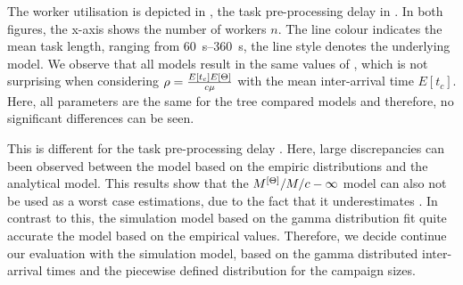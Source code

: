 The worker utilisation \workerUtilization is depicted in , the task pre-processing delay \preTaskProcessingDelay in .
In both figures, the x-axis shows the number of workers \(n\).
The line colour indicates the mean task length, ranging from \SIrange{60}{360}{\second}, the line style denotes the underlying model.
We observe that all models result in the same values of \workerUtilization, which is not surprising when considering \(\rho = \frac{E[t_c] E[\Theta]}{c\mu}\) with the mean inter-arrival time \(E[t_c]\).
Here, all parameters are the same for the tree compared models and therefore, no significant differences can be seen.

This is different for the task pre-processing delay \preTaskProcessingDelay. 
Here, large discrepancies can been observed between the model based on the empiric distributions and the analytical model.
This results show that the \(M^{[\Theta]}/M/c-\infty\) model can also not be used as a worst case estimations, due to the fact that it underestimates \preTaskProcessingDelay.
In contrast to this, the simulation model based on the gamma distribution fit quite accurate the model based on the empirical values.
Therefore, we decide continue our evaluation with the simulation model, based on the gamma distributed inter-arrival times and the piecewise defined distribution for the campaign sizes.
